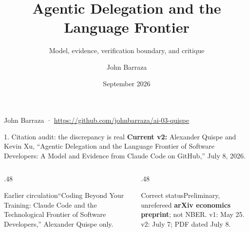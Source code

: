 \documentclass[aspectratio=169,10pt]{beamer}
\title{Agentic Delegation and the Language Frontier}
\subtitle{Model, evidence, verification boundary, and critique}
\author{John Barraza}\institute{AI Economic Modelling · Repository 03}\date{September 2026}
\begin{document}
\begin{frame}[plain]
\color{white}\vspace{1.2em}{\Huge\bfseries Agentic Delegation}\par\vspace{.3em}{\Large and the Language Frontier}\par\vspace{1.1em}{\large Quispe \& Xu (2026), arXiv:2605.25438v2}\par\vfill{\small John Barraza · \url{https://github.com/johnbarraza/ai-03-quispe}}
\end{frame}

\begin{frame}{1. Citation audit: the discrepancy is real}
\textbf{Current v2:} Alexander Quispe and Kevin Xu, “Agentic Delegation and the Language Frontier of Software Developers: A Model and Evidence from Claude Code on GitHub,” July 8, 2026.
\vspace{.8em}
\begin{columns}[T,onlytextwidth]
\begin{column}{.48\textwidth}\begin{block}{Earlier circulation}“Coding Beyond Your Training: Claude Code and the Technological Frontier of Software Developers,” Alexander Quispe only.\end{block}\end{column}
\begin{column}{.48\textwidth}\begin{alertblock}{Correct status}Preliminary, unrefereed \textbf{arXiv economics preprint}; not NBER. v1: May 25. v2: July 7; PDF dated July 8.\end{alertblock}\end{column}
\end{columns}
\end{frame}
\end{document}
